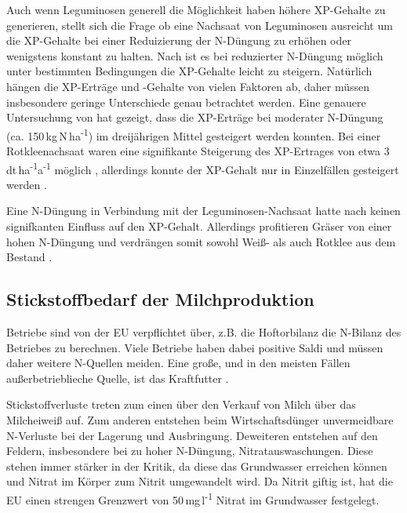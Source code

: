 Auch wenn Leguminosen generell die Möglichkeit haben höhere \ac{XP}-Gehalte zu generieren, stellt sich die Frage ob eine Nachsaat von Leguminosen ausreicht um die \ac{XP}-Gehalte bei einer Reduizierung der N-Düngung zu erhöhen oder wenigstens konstant zu halten.
Nach \textcite[11]{engel2013protein} ist es bei reduzierter N-Düngung möglich unter bestimmten Bedingungen die \ac{XP}-Gehalte leicht zu steigern.
Natürlich hängen die \ac{XP}-Erträge und -Gehalte von vielen Faktoren ab, daher müssen insbesondere geringe Unterschiede genau betrachtet werden.
Eine genauere Untersuchung von \textcite{weggler2020langzeitbeobachtungen} hat gezeigt, dass die \ac{XP}-Erträge bei moderater N-Düngung (ca. 150\,kg\,N\,ha\textsuperscript{-1}) im dreijährigen Mittel gesteigert werden konnten.
Bei einer Rotkleenachsaat waren eine signifikante Steigerung des \ac{XP}-Ertrages von etwa 3\,dt\,ha\textsuperscript{-1}a\textsuperscript{-1} möglich \parencite[12]{weggler2020langzeitbeobachtungen}, allerdings konnte der \ac{XP}-Gehalt nur in Einzelfällen gesteigert werden \parencite[13]{weggler2020langzeitbeobachtungen}.


Eine N-Düngung in Verbindung mit der Leguminosen-Nachsaat hatte nach \textcite[34]{weggler2050leguminosen} keinen signifkanten Einfluss auf den \ac{XP}-Gehalt.
Allerdings profitieren Gräser von einer hohen N-Düngung und verdrängen somit sowohl Weiß- als auch Rotklee aus dem Bestand \parencite[161]{black2009clover}.



\subsection{Stickstoffbedarf der Milchproduktion}
\label{subsec:Stickstoff}
Betriebe sind von der \ac{EU} verpflichtet über, z.B. die Hoftorbilanz die N-Bilanz des Betriebes zu berechnen.
Viele Betriebe haben dabei positive Saldi \parencite[7ff]{lellmann2005untersuchungen} und müssen daher weitere N-Quellen meiden.
Eine große, und in den meisten Fällen außerbetrieblieche Quelle, ist das Kraftfutter \parencite[62]{lellmann2005untersuchungen}.

Stickstoffverluste treten zum einen über den Verkauf von Milch über das Milcheiweiß auf.
Zum anderen entstehen beim Wirtschaftsdünger unvermeidbare N-Verluste bei der Lagerung und Ausbringung.
Deweiteren entstehen auf den Feldern, insbesondere bei zu hoher N-Düngung, Nitratauswaschungen.
Diese stehen immer stärker in der Kritik, da diese das Grundwasser erreichen können und Nitrat im Körper zum Nitrit umgewandelt wird.
Da Nitrit giftig ist, hat die \ac{EU} einen strengen Grenzwert von 50\,mg\,l\textsuperscript{-1} Nitrat im Grundwasser festgelegt.

